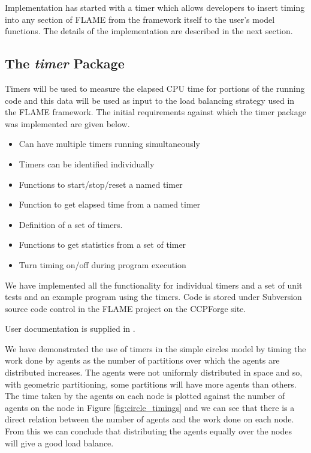Implementation has started with a timer which allows developers to insert timing into any section of FLAME from the framework itself to the user's model functions. The details of the implementation are described in the next section.

\subsection{The \textit{timer} Package}

Timers will be used to measure the elapsed CPU time for portions of the running code and this data will be used as input to the load balancing strategy used in the FLAME framework. The initial requirements against which the timer package was implemented are given below.

\begin{itemize}
\item Can have multiple timers running simultaneously
\item Timers can be identified individually
\item Functions to start/stop/reset a named timer
\item Function to get elapsed time from a named timer
\item Definition of a set of timers.
\item Functions to get statistics from a set of timer
\item Turn timing on/off during program execution 
\end{itemize}

We have implemented all the functionality for individual timers and a set of unit tests and an example program using the timers. Code is stored under Subversion source code control in the FLAME project on the CCPForge site. 

User documentation is supplied in \cite{TimerAPI}.

We have demonstrated the use of timers in the simple circles model by timing the work done by agents as the number of partitions over which the agents are distributed increases. The agents were not uniformly distributed in space and so, with geometric partitioning, some partitions will have more agents than others. The time taken by the agents on each node is plotted against the number of agents on the node in Figure \ref{fig:circle_timings} and we can see that there is a direct relation between the number of agents and the work done on each node. From this we can conclude that distributing the agents equally over the nodes will give a good load balance.

